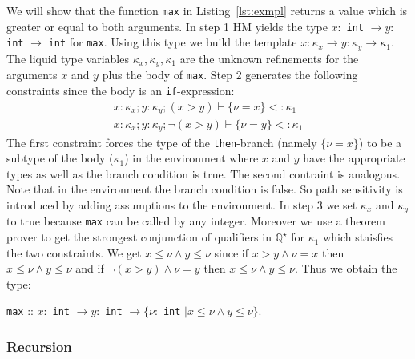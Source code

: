 \documentclass[a4paper,UKenglish]{lipics-v2016}
\begin{document}
We will show that the function \lstinline{max} in Listing~\ref{lst:exmpl} returns a value which is greater or equal to both arguments.
In step 1 HM yields the type $x:$ \lstinline{int} $\rightarrow y:$ \lstinline{int} $\rightarrow$ \lstinline{int} for \lstinline{max}.
Using this type we build the template $x: \kappa_x \rightarrow y: \kappa_y \rightarrow \kappa_1$.
The liquid type variables $\kappa_x, \kappa_y, \kappa_1$ are the unknown refinements for the arguments $x$ and $y$ plus the body of \lstinline{max}.
Step 2 generates the following constraints since the body is an \lstinline{if}-expression:
\begin{align}
    \label{algn:max}
    x: \kappa_x; y: \kappa_y; (x > y) \vdash \{\nu = x \} <: \kappa_1\\
    x: \kappa_x; y: \kappa_y; \neg(x > y) \vdash \{\nu = y \} <: \kappa_1
\end{align}
The first constraint forces the type of the \lstinline{then}-branch (namely $\{\nu = x \}$) to be a subtype of the body ($\kappa_1$) in the environment where $x$ and $y$ have the appropriate types as well as the branch condition is true.
The second contraint is analogous.
Note that in the environment the branch condition is false.
So path sensitivity is introduced by adding assumptions to the environment.
In step 3 we set $\kappa_x$ and $\kappa_y$ to true because \lstinline{max} can be called by any integer.
Moreover we use a theorem prover to get the strongest conjunction of qualifiers in $\mathbb{Q}^\star$ for $\kappa_1$ which staisfies the two constraints.
We get $x \le \nu \land y \le \nu$ since if $x > y \land \nu = x$ then $x \le \nu \land y \le \nu$ and if $\neg(x > y) \land \nu = y$ then $x \le \nu \land y \le \nu$.
Thus we obtain the type:
\begin{center}
    \lstinline{max} :: $x:$ \lstinline{int} $\rightarrow y:$ \lstinline{int} $\rightarrow \{\nu:$ \lstinline{int} $\mid x \le \nu \land y \le \nu\}$.
\end{center}


\subsubsection{Recursion}
\end{document}
